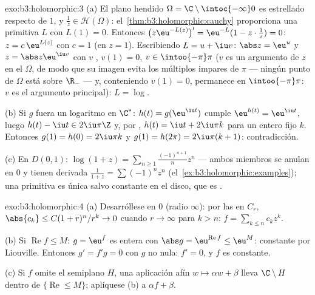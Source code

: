 \begin{solution}{exo:b3:holomorphic:3}
(a) El plano hendido $\Omega = \C\setminus\intoc{-\infty}0$ es
estrellado respecto de $1$, y $\frac1z \in \mathcal H(\Omega)$:
el~\cref{thm:b3:holomorphic:cauchy} proporciona una primitiva $L$ con
$L(1) = 0$. Entonces $\bigl(z\eu^{-L(z)}\bigr)' =
\eu^{-L}(1 - z\cdot\frac1z) = 0$: $z = c\,\eu^{L(z)}$ con $c
= 1$ (en $z = 1$). Escribiendo $L = u + \iu v$: $\abs z = \eu^u$ y
$z = \abs z\eu^{\iu v}$ con $v$
, $v(1) = 0$,
$v \in \intoo{-\pi}\pi$ ($v$ es un argumento
 de $z$ en el
 $\Omega$, de modo que su
imagen evita los múltiplos impares de $\pi$ --- ningún punto de $\Omega$
está sobre $\R_-$ --- y, conteniendo $v(1) = 0$, permanece en
$\intoo{-\pi}\pi$: $v$ es el argumento principal): $L = \log$.

(b) Si $g$ fuera un logaritmo
 en $\C^*$: $h(t) =
g(\eu^{\iu t})$ cumple $\eu^{h(t)} = \eu^{\iu t}$, luego $h(t)
- \iu t \in 2\iu\pi\Z$ y, por
, $h(t) = \iu t +
2\iu\pi k$ para un entero fijo $k$. Entonces $g(1) = h(0) =
2\iu\pi k$ y $g(1) = h(2\pi) = 2\iu\pi(k + 1)$: contradicción.

(c) En $D(0,1)$: $\log(1 + z) =
\sum_{n\geq1}\frac{(-1)^{n+1}}{n}z^n$ --- ambos miembros se anulan en
$0$ y tienen derivada $\frac1{1+z} = \sum(-1)^nz^n$
(el~\cref{ex:b3:holomorphic:examples}); una primitiva es única salvo
constante en el disco, que es
.
\end{solution}

\begin{solution}{exo:b3:holomorphic:4}
(a) Desarróllese en $0$ (radio $\infty$): por las
 en $C_r$,
$\abs{c_k} \leq C(1 + r)^n/r^k \to 0$ cuando $r \to
\infty$ para $k > n$: $f = \sum_{k\leq n}c_kz^k$.

(b) Si $\operatorname{Re}f \leq M$: $g = \eu^f$ es entera con
$\abs g = \eu^{\operatorname{Re}f} \leq \eu^M$: constante por Liouville.
Entonces $g' = f'g = 0$ con $g$ no nula: $f' =
0$, y $f$ es constante.

(c) Si $f$ omite el semiplano $H$, una aplicación afín $w \mapsto
\alpha w + \beta$ lleva $\C\setminus H$ dentro de
$\{\operatorname{Re} \leq M\}$; aplíquese (b) a $\alpha f +
\beta$.
\end{solution}


